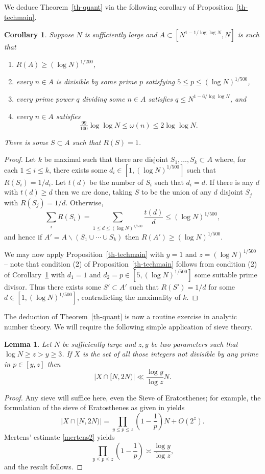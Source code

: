 \documentclass{amsart}
\newcommand{\abs}[1]{\left\lvert #1\right\rvert}
\newcommand{\brac}[1]{\left( #1\right)}
\newtheorem{lemma}{Lemma}
\newtheorem{corollary}{Corollary}
\begin{document}
We deduce Theorem~\ref{th-quant} via the following corollary of Proposition~\ref{th-techmain}.
\begin{corollary}\label{cor-techmain}
Suppose $N$ is sufficiently large and $A\subset [N^{1-1/\log\log N},N]$ is such that
\begin{enumerate}
\item $R(A)\geq (\log N)^{1/200}$,
\item every $n\in A$ is divisible by some prime $p$ satisfying $5 \leq p \leq (\log N)^{1/500}$,
\item every prime power $q$ dividing some $n\in A$ satisfies $q\leq N^{1-6/\log\log N}$, and
\item every $n\in A$ satisfies
\[\tfrac{99}{100}\log\log N\leq \omega(n) \leq 2\log\log N.\]
\end{enumerate}
There is some $S\subset A$ such that $R(S)=1$.
\end{corollary}
\begin{proof}
Let $k$ be maximal such that there are disjoint $S_1,\ldots,S_k\subset A$ where, for each $1\leq i\leq k$, there exists some $d_i\in [1,(\log N)^{1/500}]$ such that $R(S_i)=1/d_i$. Let $t(d)$ be the number of $S_i$ such that $d_i=d$. If there is any $d$ with $t(d)\geq d$ then we are done, taking $S$ to be the union of any $d$ disjoint $S_j$ with $R(S_j)=1/d$. Otherwise,
\[\sum_i R(S_i)= \sum_{1\leq d\leq (\log N)^{1/500}} \frac{t(d)}{d}\leq (\log N)^{1/500},\]
and hence if $A'=A\backslash (S_1\cup\cdots \cup S_k)$ then $R(A')\geq (\log N)^{1/500}$. 

We may now apply Proposition~\ref{th-techmain} with $y=1$ and $z=(\log N)^{1/500}$ -- note that condition (2) of Proposition~\ref{th-techmain} follows from condition (2) of Corollary~\ref{cor-techmain} with $d_1=1$ and $d_2=p\in [5,(\log N)^{1/500}]$ some suitable prime divisor. Thus there exists some $S'\subset A'$ such that $R(S')=1/d$ for some $d\in [1,(\log N)^{1/500}]$, contradicting the maximality of $k$.
\end{proof}

The deduction of Theorem~\ref{th-quant} is now a routine exercise in analytic number theory. We will require the following simple application of sieve theory. 

\begin{lemma}\label{lem-sieve1}
Let $N$ be sufficiently large and $z,y$ be two parameters such that $\log N \geq z>y\geq 3$. If $X$ is the set of all those integers not divisible by any prime in $p\in [y,z]$ then
\[\abs{ X\cap [N,2N)}\ll \frac{\log y}{\log z}N.\]
\end{lemma}
\begin{proof}
Any sieve will suffice here, even the Sieve of Eratosthenes; for example, the formulation of the sieve of Eratosthenes as given in \cite[Theorem 3.1]{MV} yields 
\[\abs{X\cap [N,2N)} = \prod_{y\leq p\leq z}\brac{1-\frac{1}{p}}N+ O(2^z).\]
Mertens' estimate \eqref{mertens2} yields
\[\prod_{y\leq p\leq z}\brac{1-\frac{1}{p}}\asymp \frac{\log y}{\log z},\]
and the result follows. 
\end{proof}
\end{document}
